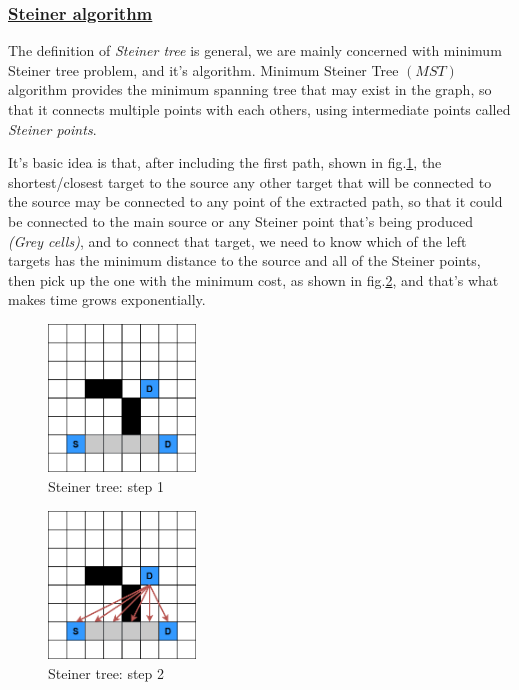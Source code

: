     \subsubsection{\underline{Steiner algorithm}}
    \label{SteinerSection}
    The definition of \emph{Steiner tree} is general, we are mainly concerned with minimum Steiner tree problem, and it's algorithm.
    Minimum Steiner Tree $(MST)$ algorithm provides the minimum spanning tree that may exist in the graph,
    so that it connects multiple points with each others, using intermediate points called \emph{Steiner points}.
    
    It's basic idea is that, after including the first path, shown in fig.\ref{fig:steiner_1}, the shortest/closest target to the source any other target that will be connected to the source may be connected to any point of the 
    extracted path, so that it could be connected to the main source or any Steiner point that's being produced \emph{(Grey cells)},
    and to connect that target, we need to know which of the left targets has the minimum distance to the source and all of the Steiner points, then pick up the one with the minimum cost, as shown in fig.\ref{fig:steiner_2}, and that's what makes time grows exponentially.

    \begin{figure}
        \centering
        \includegraphics[width=0.35\textwidth]{figures/Steiner Stages/steiner_1.png}
        \caption{Steiner tree: step 1}
        \label{fig:steiner_1}
    \end{figure}

    \begin{figure}[H]
        \centering
        \includegraphics[width=0.35\textwidth]{figures/Steiner Stages/steiner_2.png}
        \caption{Steiner tree: step 2}
        \label{fig:steiner_2}
    \end{figure}

